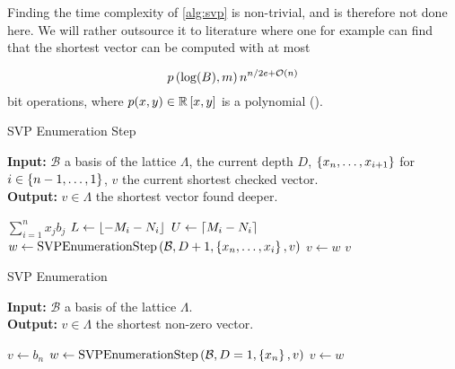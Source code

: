   Finding the time complexity of \cref{alg:svp} is non-trivial, and is therefore not done here.
  We will rather outsource it to literature where one for example can find that the shortest vector can be computed with at most

  \begin{equation}
    p\left(  \log (B), m  \right) n^{n/2e+\mathcal{O} (n)}
    \label{eq:svp-enum-complexity}
  \end{equation}
  bit operations, where $p(x, y) \in \mathbb{R}\left[  x,y  \right]$ is a polynomial (\cite{galbraith}).


  \begin{algorithm}
    \caption{SVP Enumeration Step}
    \label{alg:svp-enumeration-step}
    \textbf{Input:} $\mathcal{B}$ a basis of the lattice $\Lambda$, the current depth $D$, $\left\lbrace x_n, \dots, x_{i+1} \right\rbrace$ for $i\in \left\lbrace n-1, \dots, 1 \right\rbrace$, $v$ the current shortest checked vector. \\
    \textbf{Output:} $v \in \Lambda$ the shortest vector found deeper. \\
    \begin{algorithmic}[1]
        \Return $\sum_{i=1}^{n} x_j b_j$ 
      \Else
        \State $L \gets \left\lfloor  -M_i - N_i  \right\rfloor$
        \State $U \gets \left\lceil M_i - N_i \right\rceil$
          \State $w \gets \operatorname{SVP Enumeration Step} \left(  \mathcal{B}, D+1, \left\lbrace x_n, \dots, x_i \right\rbrace, v \right)$
            \State $v \gets w$
          \EndIf
        \EndFor
        \State \Return $v$
      \EndIf
    \end{algorithmic}
  \end{algorithm}

  \begin{algorithm}
    \caption{SVP Enumeration}
    \label{alg:svp}
    \textbf{Input:} $\mathcal{B}$ a basis of the lattice $\Lambda$. \\
    \textbf{Output:} $v \in \Lambda$ the shortest non-zero vector. \\
    \begin{algorithmic}[1]
      \State $v \gets b_n$
        \State $w \gets \operatorname{SVP Enumeration Step} \left(  \mathcal{B}, D=1, \left\lbrace x_n \right\rbrace, v  \right)$
          \State $v \gets w$
        \EndIf
      \EndFor
    \end{algorithmic}
  \end{algorithm}



